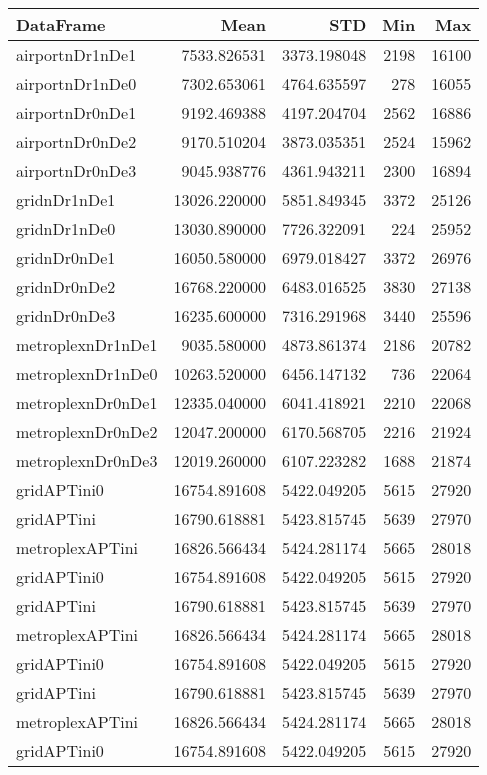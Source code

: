 \begin{tabular}{lrrrr}
\toprule
DataFrame & Mean & STD & Min & Max \\
\midrule
airportnDr1nDe1 & 7533.826531 & 3373.198048 & 2198 & 16100 \\
airportnDr1nDe0 & 7302.653061 & 4764.635597 & 278 & 16055 \\
airportnDr0nDe1 & 9192.469388 & 4197.204704 & 2562 & 16886 \\
airportnDr0nDe2 & 9170.510204 & 3873.035351 & 2524 & 15962 \\
airportnDr0nDe3 & 9045.938776 & 4361.943211 & 2300 & 16894 \\
gridnDr1nDe1 & 13026.220000 & 5851.849345 & 3372 & 25126 \\
gridnDr1nDe0 & 13030.890000 & 7726.322091 & 224 & 25952 \\
gridnDr0nDe1 & 16050.580000 & 6979.018427 & 3372 & 26976 \\
gridnDr0nDe2 & 16768.220000 & 6483.016525 & 3830 & 27138 \\
gridnDr0nDe3 & 16235.600000 & 7316.291968 & 3440 & 25596 \\
metroplexnDr1nDe1 & 9035.580000 & 4873.861374 & 2186 & 20782 \\
metroplexnDr1nDe0 & 10263.520000 & 6456.147132 & 736 & 22064 \\
metroplexnDr0nDe1 & 12335.040000 & 6041.418921 & 2210 & 22068 \\
metroplexnDr0nDe2 & 12047.200000 & 6170.568705 & 2216 & 21924 \\
metroplexnDr0nDe3 & 12019.260000 & 6107.223282 & 1688 & 21874 \\
gridAPTini0 & 16754.891608 & 5422.049205 & 5615 & 27920 \\
gridAPTini & 16790.618881 & 5423.815745 & 5639 & 27970 \\
metroplexAPTini & 16826.566434 & 5424.281174 & 5665 & 28018 \\
gridAPTini0 & 16754.891608 & 5422.049205 & 5615 & 27920 \\
gridAPTini & 16790.618881 & 5423.815745 & 5639 & 27970 \\
metroplexAPTini & 16826.566434 & 5424.281174 & 5665 & 28018 \\
gridAPTini0 & 16754.891608 & 5422.049205 & 5615 & 27920 \\
gridAPTini & 16790.618881 & 5423.815745 & 5639 & 27970 \\
metroplexAPTini & 16826.566434 & 5424.281174 & 5665 & 28018 \\
gridAPTini0 & 16754.891608 & 5422.049205 & 5615 & 27920 \\

\end{tabular}
